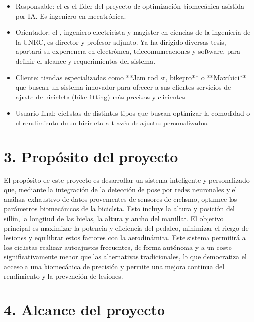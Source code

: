 \documentclass[
11pt, %
]{charter}
\begin{document}
\begin{itemize}

\item Responsable: cl \authorname  es el líder del proyecto de optimización biomecánica asistida por IA. Es ingeniero en mecatrónica.

\item Orientador: cl \supname	, ingeniero electricista y magister en ciencias de la ingeniería de la UNRC, es director y profesor adjunto. Ya ha dirigido diversas tesis, aportará su experiencia en electrónica, telecomunicaciones y software, para definir el alcance y requerimientos del sistema.
\item Cliente: tiendas especializadas como **Jam rod sr, bikepro** o **Maxibici** que buscan un sistema innovador para ofrecer a sus clientes servicios de ajuste de bicicleta (bike fitting) más precisos y eficientes.

\item Usuario final: ciclistas de distintos tipos que buscan optimizar la comodidad o el rendimiento de su bicicleta a través de ajustes personalizados.
\end{itemize}



\section{3. Propósito del proyecto}
\label{sec:proposito}
El propósito de este proyecto es desarrollar un sistema inteligente y personalizado que, mediante la integración de la detección de pose por redes neuronales y el análisis exhaustivo de datos provenientes de sensores de ciclismo, optimice los parámetros biomecánicos de la bicicleta. Esto incluye la altura y posición del sillín, la longitud de las bielas, la altura y ancho del manillar. El objetivo principal es maximizar la potencia y eficiencia del pedaleo, minimizar el riesgo de lesiones y equilibrar estos factores con la aerodinámica.
Este sistema permitirá a los ciclistas realizar autoajustes frecuentes, de forma autónoma y a un costo significativamente menor que las alternativas tradicionales, lo que democratiza el acceso a una biomecánica de precisión y permite una mejora continua del rendimiento y la prevención de lesiones.

\section{4. Alcance del proyecto}
\label{sec:alcance}
\end{document}
